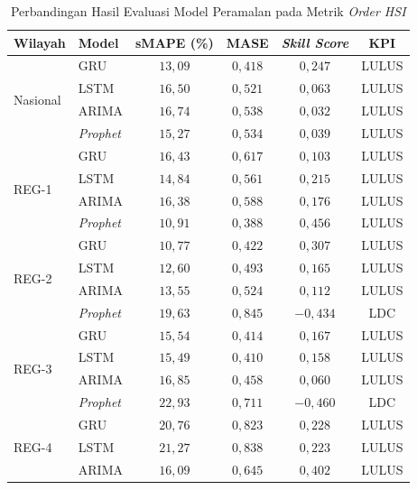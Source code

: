 \begin{table}[htbp]
\centering
\caption{Perbandingan Hasil Evaluasi Model Peramalan pada Metrik \textit{Order HSI}}
\label{tab:hasil-forecasting-order}
\begin{tabular}{|p{2.2cm}|p{1.5cm}|c|c|c|c|}
\hline
\textbf{Wilayah} & \textbf{Model} & \textbf{sMAPE (\%)} & \textbf{MASE} & \textbf{\textit{Skill Score}} & \textbf{KPI} \\
\hline
\multirow{4}{*}{Nasional} & GRU & $13{,}09$ & $0{,}418$ & $0{,}247$ & LULUS \\
\cline{2-6}
 & LSTM & $16{,}50$ & $0{,}521$ & $0{,}063$ & LULUS \\
\cline{2-6}
 & ARIMA & $16{,}74$ & $0{,}538$ & $0{,}032$ & LULUS \\
\cline{2-6}
 & \textit{Prophet} & $15{,}27$ & $0{,}534$ & $0{,}039$ & LULUS \\
\hline
\multirow{4}{*}{REG-1} & GRU & $16{,}43$ & $0{,}617$ & $0{,}103$ & LULUS \\
\cline{2-6}
 & LSTM & $14{,}84$ & $0{,}561$ & $0{,}215$ & LULUS \\
\cline{2-6}
 & ARIMA & $16{,}38$ & $0{,}588$ & $0{,}176$ & LULUS \\
\cline{2-6}
 & \textit{Prophet} & $10{,}91$ & $0{,}388$ & $0{,}456$ & LULUS \\
\hline
\multirow{4}{*}{REG-2} & GRU & $10{,}77$ & $0{,}422$ & $0{,}307$ & LULUS \\
\cline{2-6}
 & LSTM & $12{,}60$ & $0{,}493$ & $0{,}165$ & LULUS \\
\cline{2-6}
 & ARIMA & $13{,}55$ & $0{,}524$ & $0{,}112$ & LULUS \\
\cline{2-6}
 & \textit{Prophet} & $19{,}63$ & $0{,}845$ & $-0{,}434$ & LDC \\
\hline
\multirow{4}{*}{REG-3} & GRU & $15{,}54$ & $0{,}414$ & $0{,}167$ & LULUS \\
\cline{2-6}
 & LSTM & $15{,}49$ & $0{,}410$ & $0{,}158$ & LULUS \\
\cline{2-6}
 & ARIMA & $16{,}85$ & $0{,}458$ & $0{,}060$ & LULUS \\
\cline{2-6}
 & \textit{Prophet} & $22{,}93$ & $0{,}711$ & $-0{,}460$ & LDC \\
\hline
\multirow{4}{*}{REG-4} & GRU & $20{,}76$ & $0{,}823$ & $0{,}228$ & LULUS \\
\cline{2-6}
 & LSTM & $21{,}27$ & $0{,}838$ & $0{,}223$ & LULUS \\
\cline{2-6}
 & ARIMA & $16{,}09$ & $0{,}645$ & $0{,}402$ & LULUS \\

\end{tabular}
\end{table}
